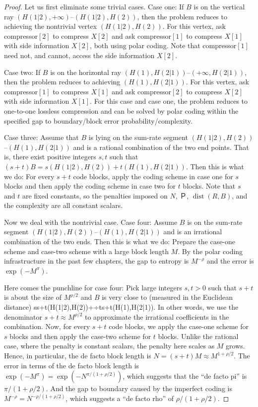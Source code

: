\documentclass[openany]{amsbook}
\numberwithin{equation}{chapter}
\numberwithin{figure}{chapter}
\numberwithin{table}{chapter}
\DeclareMathOperator\dist{dist}
\def\[#1\]{\begin{equation*}{#1}\end{equation*}}
\theoremstyle{definition}	理dfn:Definition~?s			理exa:Example~?s
\theoremstyle{remark}		理cla:Claim~?s				理rem:Remark~?s
\begin{document}
	\begin{proof}
		Let us first eliminate some trivial cases.
		Case one:
		If $B$ is on the vertical ray $(H(1|2),+∞)$--$(H(1|2),H(2))$,
		then the problem reduces to achieving the nontrivial vertex $(H(1|2),H(2))$.
		For this vertex, ask compressor$[2]$ to compress $X[2]$ and ask compressor$[1]$
		to compress $X[1]$ with side information $X[2]$, both using polar coding.
		Note that compressor$[1]$ need not, and cannot,
		access the side information $X[2]$.
		
		Case two:
		If $B$ is on the horizontal ray $(H(1),H(2|1))$--$(+∞,H(2|1))$,
		then the problem reduces to achieving $(H(1),H(2|1))$.
		For this vertex, ask compressor$[1]$ to compress $X[1]$
		and ask compressor$[2]$ to compress $X[2]$ with side information $X[1]$.
		For this case and case one, the problem reduces to
		one-to-one lossless compression and can be solved by polar coding
		within the specified gap to boundary/block error probability/complexity.
		
		Case three:
		Assume that $B$ is lying on the sum-rate segment
		$(H(1|2),H(2))$--$(H(1),H(2|1))$
		and is a rational combination of the two end points.
		That is, there exist positive integers $s,t$
		such that $(s+t)B=s(H(1|2),H(2))+t(H(1),H(2|1))$.
		Then this is what we do:
		For every $s+t$ code blocks, apply the coding scheme in case one for $s$ blocks
		and then apply the coding scheme in case two for $t$ blocks.
		Note that $s$ and $t$ are fixed constants, so the penalties imposed
		on $N$, $Ｐ$, $\dist(R,B)$, and the complexity are all constant scalars.
		
		Now we deal with the nontrivial case.
		Case four:
		Assume $B$ is on the sum-rate segment $(H(1|2),H(2))$--$(H(1),H(2|1))$
		and is an irrational combination of the two ends.
		Then this is what we do:
		Prepare the case-one scheme and case-two scheme with a large block length $M$.
		By the polar coding infrastructure in the past few chapters,
		the gap to entropy is $M^{-ρ}$ and the error is $\exp(-M^π)$.
		
		Here comes the punchline for case four:
		Pick large integers $s,t>0$ such that $s+t$ is about the size of $M^{ρ/2}$
		and $B$ is very close to (measured in the Euclidean distance)
		\[÷s{s+t}(H(1|2),H(2))+÷t{s+t}(H(1),H(2|1)).\label{app:rational}\]
		In other words, we use the denominator $s+t≈M^{ρ/2}$
		to approximate the irrational coefficients in the combination.
		Now, for every $s+t$ code blocks, we apply the case-one scheme for $s$ blocks
		and then apply the case-two scheme for $t$ blocks.
		Unlike the rational case, where the penalty is constant scalars,
		the penalty here scales as $M$ grows.
		Hence, in particular, the de facto block length is $N=(s+t)M≈M^{1+ρ/2}$.
		The error in terms of the de facto block length is
		$\exp(-M^π)=\exp(-N^{π/(1+ρ/2)})$, which
		suggests that the “de facto pi” is $π/(1+ρ/2)$.
		And the gap to boundary caused by the imperfect coding is
		$M^{-ρ}=N^{-ρ/(1+ρ/2)}$, which suggests a “de facto rho” of $ρ/(1+ρ/2)$.
		

\end{proof}
\end{document}
